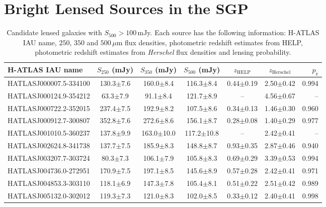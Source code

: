 \chapter{Bright Lensed Sources in the SGP}

\begin{landscape}
\begin{longtable}{lcccccr}

    \caption[Candidate lensed galaxies with $S_{500} > 100\,$mJy]{Candidate lensed galaxies with $S_{500} > 100\,$mJy. Each source has the following information: H-ATLAS IAU name, $250$, $350$ and $500\,\mu$m flux densities, photometric redshift estimates from HELP, photometric redshift estimates from \textit{Herschel} flux densities and lensing probability.} 
    \label{tab:SLG_candidates} \\
    \hline
    \hline
    H-ATLAS IAU name & $S_{250}$ (mJy) & $S_{350}$ (mJy) & $S_{500}$ (mJy) & $z_{\textrm{HELP}}$ & $z_{\textrm{Herschel}}$ & $p_{\textrm{z}}$ \\
    \hline
    \hline
    HATLASJ000007.5-334100 & 130.3$\pm$7.6 & 160.0$\pm$8.4 & 116.3$\pm$8.4 & 0.44$\pm$0.19 & 2.50$\pm$0.42 & 0.994 \\
    HATLASJ000124.9-354212 & 63.3$\pm$7.9 & 91.1$\pm$8.4 & 121.7$\pm$8.9 & -- & 4.56$\pm$0.67 & -- \\
    HATLASJ000722.2-352015 & 237.4$\pm$7.5 & 192.9$\pm$8.2 & 107.5$\pm$8.6 & 0.34$\pm$0.13 & 1.46$\pm$0.30 & 0.960 \\
    HATLASJ000912.7-300807 & 352.8$\pm$7.6 & 272.6$\pm$8.6 & 156.1$\pm$8.7 & 0.28$\pm$0.08 & 1.40$\pm$0.29 & 0.977 \\
    HATLASJ001010.5-360237 & 137.8$\pm$9.9 & 163.0$\pm$10.0 & 117.2$\pm$10.8 & -- & 2.42$\pm$0.41 & -- \\
    HATLASJ002624.8-341738 & 137.7$\pm$7.5 & 185.9$\pm$8.3 & 148.8$\pm$8.7 & 0.93$\pm$0.35 & 2.87$\pm$0.46 & 0.940 \\
    HATLASJ003207.7-303724 & 80.3$\pm$7.3 & 106.1$\pm$7.9 & 105.8$\pm$8.3 & 0.69$\pm$0.29 & 3.39$\pm$0.53 & 0.994 \\ 
    HATLASJ004736.0-272951 & 170.9$\pm$7.5 & 197.1$\pm$8.5 & 145.6$\pm$8.9 & 0.57$\pm$0.28 & 2.42$\pm$0.41 & 0.971 \\ 
    HATLASJ004853.3-303110 & 118.1$\pm$6.9 & 147.3$\pm$7.8 & 105.4$\pm$8.1 & 0.51$\pm$0.22 & 2.51$\pm$0.42 & 0.989 \\ 
    HATLASJ005132.0-302012 & 119.3$\pm$7.3 & 121.0$\pm$8.3 & 102.0$\pm$8.5 & 0.33$\pm$0.12 & 2.40$\pm$0.41 & 0.998 \\

\end{longtable}
\end{landscape}
